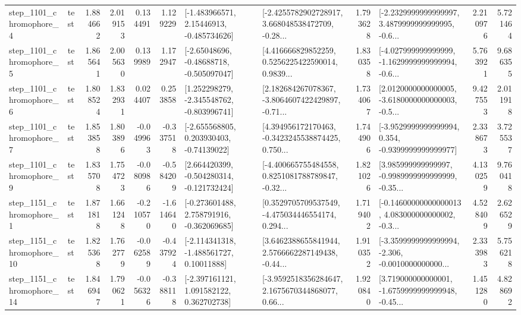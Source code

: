 \begin{tabular}{llrrrrllrlrr}
  step\_1101\_chromophore\_4 &      test &      1.884662 &    2.019153 &      0.134491 &  1.129229 &    [-1.483966571, 2.15446913, -0.485734626] &  [-2.4255782902728917, 3.668048538472709, -0.28... &       1.793628 &  [-2.2329999999999997, 3.4879999999999995, -0.6... &            2.210976 &          5.721464 \\
  step\_1101\_chromophore\_5 &      test &      1.865641 &    2.005630 &      0.139989 &  1.172947 &    [-2.65048696, -0.48688718, -0.505097047] &  [4.416666829852259, 0.5256225422590014, 0.9839... &       1.830358 &  [-4.027999999999999, -1.1629999999999994, -0.6... &            5.763921 &          9.686355 \\
  step\_1101\_chromophore\_6 &      test &      1.808524 &    1.832931 &      0.024407 &  0.253858 &   [1.252298279, -2.345548762, -0.803996741] &  [2.182684267078367, -3.8064607422429897, -0.71... &       1.734067 &  [2.0120000000000005, -3.6180000000000003, -0.5... &            9.427553 &          2.011918 \\
  step\_1101\_chromophore\_7 &      test &      1.853858 &    1.803896 &     -0.049963 & -0.337518 &    [-2.655568805, 0.203930403, -0.74139022] &  [4.394956172170463, -0.3423245538874425, 0.750... &       1.744906 &  [-3.9529999999999994, 0.354, -0.9399999999999977] &            2.338673 &          3.725537 \\
  step\_1101\_chromophore\_9 &      test &      1.835708 &    1.754723 &     -0.080986 & -0.584209 &   [2.664420399, -0.504280314, -0.121732424] &  [-4.400665755484558, 0.8251081788789847, -0.32... &       1.821026 &  [3.985999999999997, -0.9989999999999999, -0.35... &            4.130259 &          9.760418 \\
  step\_1151\_chromophore\_1 &      test &      1.871818 &    1.661248 &     -0.210570 & -1.614640 &   [-0.273601488, 2.758791916, -0.362069685] &  [0.3529705709537549, -4.475034446554174, 0.294... &       1.719402 &  [-0.14600000000000013, 4.083000000000002, -0.3... &            4.528409 &          2.626529 \\
 step\_1151\_chromophore\_10 &      test &      1.825368 &    1.762779 &     -0.062589 & -0.437924 &    [-2.114341318, -1.488561727, 0.10011888] &  [3.6462388655841944, 2.5766662287149438, -0.44... &       1.910352 &  [-3.3599999999999994, -2.306, -0.0010000000000... &            2.333983 &          5.756218 \\
 step\_1151\_chromophore\_14 &      test &      1.846947 &    1.790621 &     -0.056326 & -0.388118 &    [-2.397161121, 1.091582122, 0.362702738] &  [-3.9592518356284647, 2.1675670344868077, 0.66... &       1.920840 &  [3.719000000000001, -1.6759999999999948, -0.45... &            1.451280 &          4.828692 \\

\end{tabular}
